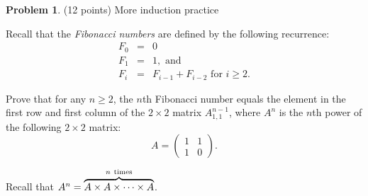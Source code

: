 \documentclass[11pt]{article}
\theoremstyle{definition}
\theoremstyle{theorem}
\newtheorem{prob}{Problem}
\begin{document}
\newpage

\begin{prob}
  (12 points) More induction practice
\end{prob}

Recall that the {\em Fibonacci numbers}\/ are defined by the following
recurrence:
\begin{eqnarray*}
F_0 & = & 0\\
F_1 & = & 1, \mbox{ and}\\
F_i & = & F_{i-1} + F_{i-2} \mbox{ for } i \ge 2.
\end{eqnarray*}

Prove that for any $n \ge 2$, the $n$th Fibonacci number equals the
element in the first row and first column of the $2 \times 2$ matrix
$A^{n-1}_{1,1}$, where $A^n$ is the $n$th power of the following
$2 \times 2$ matrix:
\[
A = \left( 
\begin{array}{cc}
1 & 1\\ 
1 & 0
\end{array}
\right).
\]

Recall that $A^n = \overbrace{A \times A \times \cdots \times A}^{n \mbox{ \scriptsize{times}}}$.
\end{document}

